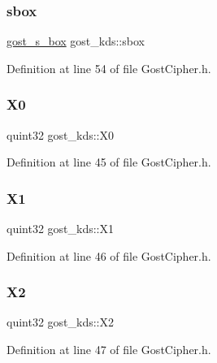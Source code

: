 \subsubsection{\texorpdfstring{sbox}{sbox}}
{\footnotesize\ttfamily \hyperlink{structgost__s__box}{gost\+\_\+s\+\_\+box} gost\+\_\+kds\+::sbox}



Definition at line 54 of file Gost\+Cipher.\+h.

\mbox{\label{structgost__kds_ad279c5ef8dfdd263d9077a6a0754f242}} 
\subsubsection{\texorpdfstring{X0}{X0}}
{\footnotesize\ttfamily quint32 gost\+\_\+kds\+::\+X0}



Definition at line 45 of file Gost\+Cipher.\+h.

\mbox{\label{structgost__kds_a155ecf738230f808adc83f90db195324}} 
\subsubsection{\texorpdfstring{X1}{X1}}
{\footnotesize\ttfamily quint32 gost\+\_\+kds\+::\+X1}



Definition at line 46 of file Gost\+Cipher.\+h.

\mbox{\label{structgost__kds_a568f9b4285b08860efa757714dd7bab4}} 
\subsubsection{\texorpdfstring{X2}{X2}}
{\footnotesize\ttfamily quint32 gost\+\_\+kds\+::\+X2}



Definition at line 47 of file Gost\+Cipher.\+h.

\mbox{\label{structgost__kds_a258c070dbf4f8ed47c422da09e109e3c}} 
